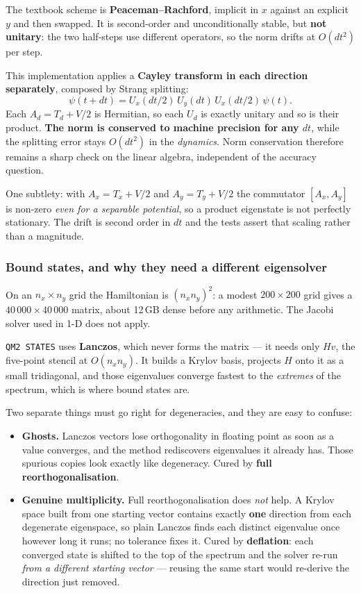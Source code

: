 \documentclass[11pt]{article}
\newcommand{\code}[1]{\texttt{#1}}
\begin{document}
The textbook scheme is \textbf{Peaceman--Rachford}, implicit in $x$
against an explicit $y$ and then swapped. It is second-order and
unconditionally stable, but \textbf{not unitary}: the two half-steps use
different operators, so the norm drifts at $O(dt^2)$ per step.

This implementation applies a \textbf{Cayley transform in each direction
separately}, composed by Strang splitting:
\[
  \psi(t+dt) = U_x(dt/2)\,U_y(dt)\,U_x(dt/2)\,\psi(t).
\]
Each $A_d = T_d + V/2$ is Hermitian, so each $U_d$ is exactly unitary and
so is their product. \textbf{The norm is conserved to machine precision
for any $dt$}, while the splitting error stays $O(dt^2)$ in the
\emph{dynamics}. Norm conservation therefore remains a sharp check on the
linear algebra, independent of the accuracy question.

One subtlety: with $A_x=T_x+V/2$ and $A_y=T_y+V/2$ the commutator
$[A_x,A_y]$ is non-zero \emph{even for a separable potential}, so a
product eigenstate is not perfectly stationary. The drift is second order
in $dt$ and the tests assert that scaling rather than a magnitude.

\subsubsection*{Bound states, and why they need a different eigensolver}

On an $n_x\times n_y$ grid the Hamiltonian is $(n_x n_y)^2$: a modest
$200\times200$ grid gives a $40\,000\times40\,000$ matrix, about 12\,GB
dense before any arithmetic. The Jacobi solver used in 1-D does not
apply.

\code{QM2 STATES} uses \textbf{Lanczos}, which never forms the matrix ---
it needs only $Hv$, the five-point stencil at $O(n_x n_y)$. It builds a
Krylov basis, projects $H$ onto it as a small tridiagonal, and those
eigenvalues converge fastest to the \emph{extremes} of the spectrum,
which is where bound states are.

Two separate things must go right for degeneracies, and they are easy to
confuse:

\begin{itemize}
\item \textbf{Ghosts.} Lanczos vectors lose orthogonality in floating
      point as soon as a value converges, and the method rediscovers
      eigenvalues it already has. Those spurious copies look exactly like
      degeneracy. Cured by \textbf{full reorthogonalisation}.
\item \textbf{Genuine multiplicity.} Full reorthogonalisation does
      \emph{not} help. A Krylov space built from one starting vector
      contains exactly \textbf{one} direction from each degenerate
      eigenspace, so plain Lanczos finds each distinct eigenvalue once
      however long it runs; no tolerance fixes it. Cured by
      \textbf{deflation}: each converged state is shifted to the top of
      the spectrum and the solver re-run \emph{from a different starting
      vector} --- reusing the same start would re-derive the direction
      just removed.
\end{itemize}
\end{document}
